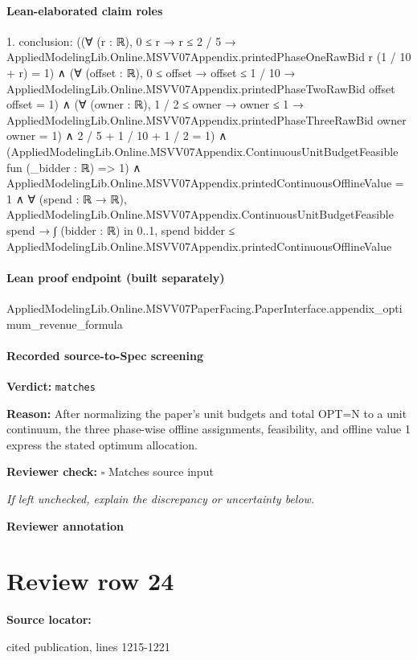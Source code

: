 \documentclass[10pt]{article}
\newcommand{\reviewerbox}{%
  \par\noindent\fbox{\parbox{0.96\linewidth}{\rule{0pt}{0.38in}}}\par
}
\newcommand{\reviewmatch}[1]{%
  \par\noindent\textbf{Reviewer check:} $\square$\; #1\par
  \noindent\emph{If left unchecked, explain the discrepancy or uncertainty below.}\par
}
\begin{document}
\paragraph{Lean-elaborated claim roles}\begin{ReviewVerbatim}
1. conclusion: ((∀ (r : ℝ), 0 ≤ r → r ≤ 2 / 5 → AppliedModelingLib.Online.MSVV07Appendix.printedPhaseOneRawBid r (1 / 10 + r) = 1) ∧
    (∀ (offset : ℝ),
        0 ≤ offset →
          offset ≤ 1 / 10 → AppliedModelingLib.Online.MSVV07Appendix.printedPhaseTwoRawBid offset offset = 1) ∧
      (∀ (owner : ℝ),
          1 / 2 ≤ owner →
            owner ≤ 1 → AppliedModelingLib.Online.MSVV07Appendix.printedPhaseThreeRawBid owner owner = 1) ∧
        2 / 5 + 1 / 10 + 1 / 2 = 1) ∧
  (AppliedModelingLib.Online.MSVV07Appendix.ContinuousUnitBudgetFeasible fun (_bidder : ℝ) => 1) ∧
    AppliedModelingLib.Online.MSVV07Appendix.printedContinuousOfflineValue = 1 ∧
      ∀ (spend : ℝ → ℝ),
        AppliedModelingLib.Online.MSVV07Appendix.ContinuousUnitBudgetFeasible spend →
          ∫ (bidder : ℝ) in 0..1, spend bidder ≤ AppliedModelingLib.Online.MSVV07Appendix.printedContinuousOfflineValue
\end{ReviewVerbatim}

\paragraph{Lean proof endpoint (built separately)}\begin{ReviewVerbatim}
AppliedModelingLib.Online.MSVV07PaperFacing.PaperInterface.appendix_optimum_revenue_formula
\end{ReviewVerbatim}

\paragraph{Recorded source-to-Spec screening}
\textbf{Verdict:} \texttt{matches}
\\
{\raggedright
\textbf{Reason:} After normalizing the paper's unit budgets and total OPT=N to a unit continuum, the three phase-\allowbreak{}wise offline assignments, feasibility, and offline value 1 express the stated optimum allocation.\allowbreak{}
\par}
\reviewmatch{Matches source input}
\noindent\textbf{Reviewer annotation}\par
\reviewerbox
\clearpage
\hypertarget{source-claim-b8b3787a44c14215}{}
\section*{Review row 24}
\textbf{Source locator:} {\footnotesize\raggedright cited publication, lines 1215-\allowbreak{}1221\par}
\end{document}
